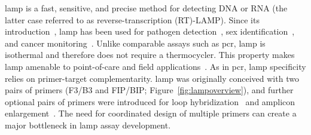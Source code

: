 \documentclass[../thesis.tex]{subfiles}
\begin{document}
\gls{lamp} is a fast, sensitive, and precise method for detecting DNA or RNA (the latter case referred to as reverse-transcription (RT)-LAMP). Since its introduction~\citep{notomi_loop-mediated_2000}, \gls{lamp} has been used for pathogen detection~\citep{mekata_real-time_2009, cao_development_2017, thiessen_development_2018}, sex identification~\citep{hirayama_embryo_2013, almasi_loop_2017, centeno-cuadros_validation_2018}, and cancer monitoring~\citep{li_loop-mediated_2016, horiuchi_novel_2020, kalofonou_novel_2020}. 
Unlike comparable assays such as \gls{pcr}, \gls{lamp} is isothermal and therefore does not require a thermocycler. This property makes \gls{lamp} amenable to point-of-care and field applications~\citep{fu_applications_2011}. 
As in \gls{pcr}, \gls{lamp} specificity relies on primer-target complementarity. \gls{lamp} was originally conceived with two pairs of primers (F3/B3 and FIP/BIP; Figure~\ref{fig:lampoverview}), and further optional pairs of primers were introduced for loop hybridization~\citep{nagamine_accelerated_2002} and amplicon enlargement~\citep{gandelman_loop-mediated_2011}. The need for coordinated design of multiple primers can create a major bottleneck in \gls{lamp} assay development. 
\end{document}
